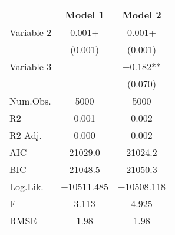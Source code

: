 \begin{table}
\centering
\begin{tabular}[t]{lcc}
\toprule
  & Model 1 & Model 2\\
\midrule
Variable 2 & \num{0.001}+ & \num{0.001}+\\
 & (\num{0.001}) & (\num{0.001})\\
Variable 3 &  & \num{-0.182}**\\
 &  & (\num{0.070})\\
\midrule
Num.Obs. & \num{5000} & \num{5000}\\
R2 & \num{0.001} & \num{0.002}\\
R2 Adj. & \num{0.000} & \num{0.002}\\
AIC & \num{21029.0} & \num{21024.2}\\
BIC & \num{21048.5} & \num{21050.3}\\
Log.Lik. & \num{-10511.485} & \num{-10508.118}\\
F & \num{3.113} & \num{4.925}\\
RMSE & \num{1.98} & \num{1.98}\\
\bottomrule
\end{tabular}
\end{table}
